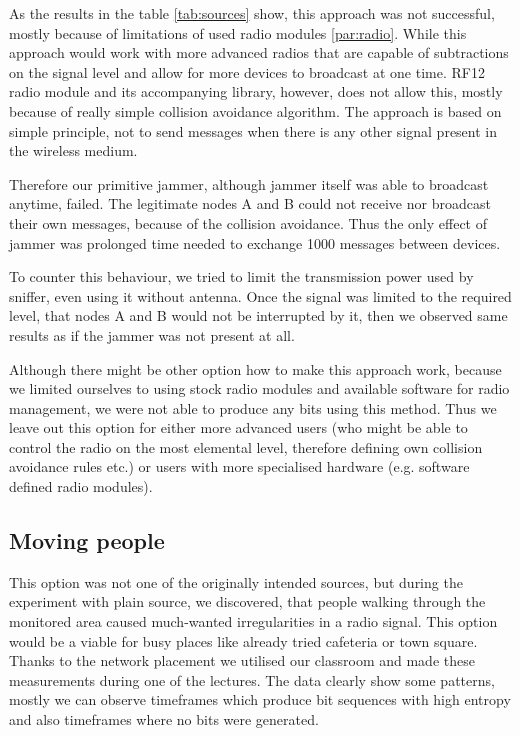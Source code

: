 \documentclass[
  print, %
  table,   %
  nolof,     %
  nolot,     %
           oneside
]{fithesis3}
\begin{document}
  As the results in the table \ref{tab:sources} show, this approach was not successful, mostly because of limitations of used radio modules \ref{par:radio}. While this approach would work with more advanced radios that are capable of subtractions on the signal level and allow for more devices to broadcast at one time. RF12 radio module and its accompanying library, however, does not allow this, mostly because of really simple collision avoidance algorithm. The approach is based on simple principle, not to send messages when there is any other signal present in the wireless medium.

  Therefore our primitive jammer, although jammer itself was able to broadcast anytime, failed. The legitimate nodes A and B could not receive nor broadcast their own messages, because of the collision avoidance. Thus the only effect of jammer was prolonged time needed to exchange 1000 messages between devices.

  To counter this behaviour, we tried to limit the transmission power used by sniffer, even using it without antenna. Once the signal was limited to the required level, that nodes A and B would not be interrupted by it, then we observed same results as if the jammer was not present at all.

  Although there might be other option how to make this approach work, because we limited ourselves to using stock radio modules and available software for radio management, we were not able to produce any bits using this method.
  Thus we leave out this option for either more advanced users (who might be able to control the radio on the most elemental level, therefore defining own collision avoidance rules etc.) or users with more specialised hardware (e.g. software defined radio modules). %

  \subsection{Moving people}\label{src:people}
  This option was not one of the originally intended sources, but during the experiment with plain source, we discovered, that people walking through the monitored area caused much-wanted irregularities in a radio signal. This option would be a viable for busy places like already tried cafeteria \cite{Mathur2008Rssi} or town square. Thanks to the network placement we utilised our classroom and made these measurements during one of the lectures. The data clearly show some patterns, mostly we can observe timeframes which produce bit sequences with high entropy and also timeframes where no bits were generated.
\end{document}

